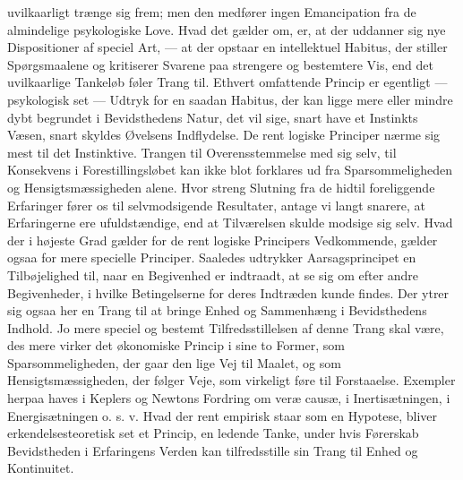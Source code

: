 \documentclass[12pt,a4paper,openany]{book}
\newcommand{\opage}[1]{\marginnote{\footnotesize\textit{[#1]}}}
\begin{document}
uvilkaarligt trænge sig frem; men den medfører ingen Emancipation fra de
almindelige psykologiske Love. Hvad det gælder om, er, at der uddanner sig nye
Dispositioner af speciel Art, --- at der opstaar en intellektuel Habitus, der
stiller Spørgsmaalene og kritiserer Svarene paa strengere og bestemtere Vis,
end det uvilkaarlige Tankeløb føler Trang til. Ethvert omfattende Princip er
egentligt --- psykologisk set --- Udtryk for en saadan Habitus, der kan ligge
mere eller mindre dybt begrundet i Bevidsthedens Natur, det vil sige, snart
have et Instinkts Væsen, snart skyldes Øvelsens Indflydelse. De rent logiske
Principer nærme sig mest til det Instinktive. Trangen til Overensstemmelse med
sig selv, til Konsekvens i Forestillingsløbet kan ikke blot forklares ud fra
Sparsommeligheden og Hensigtsmæssigheden alene. Hvor streng Slutning fra de
hidtil foreliggende Erfaringer fører os til selvmodsigende Resultater, antage
vi langt snarere, at Erfaringerne ere ufuldstændige, end at Tilværelsen skulde
modsige sig selv. Hvad der i højeste Grad gælder for de rent logiske Principers
Vedkommende, gælder ogsaa for mere specielle Principer. Saaledes udtrykker
Aarsagsprincipet en Tilbøjelighed til, naar
\opage{36}en Begivenhed er indtraadt, at se sig om efter andre Begivenheder, i
hvilke Betingelserne for deres Indtræden kunde findes. Der ytrer sig ogsaa her
en Trang til at bringe Enhed og Sammenhæng i Bevidsthedens Indhold. Jo mere
speciel og bestemt Tilfredsstillelsen af denne Trang skal være, des mere virker
det økonomiske Princip i sine to Former, som Sparsommeligheden, der gaar den
lige Vej til Maalet, og som Hensigtsmæssigheden, der følger Veje, som virkeligt
føre til Forstaaelse. Exempler herpaa haves i Keplers og Newtons Fordring om
veræ causæ, i Inertisætningen, i Energisætningen o. s. v. Hvad der rent
empirisk staar som en Hypotese, bliver erkendelsesteoretisk set et Princip, en
ledende Tanke, under hvis Førerskab Bevidstheden i Erfaringens Verden kan
tilfredsstille sin Trang til Enhed og Kontinuitet.
\end{document}
